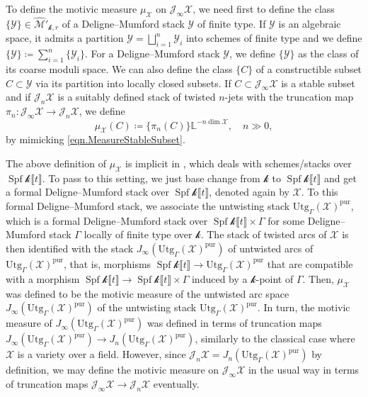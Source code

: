 \documentclass[12pt]{amsart}
\theoremstyle{plain}   %
\theoremstyle{definition}    %
\theoremstyle{remark}    %
\numberwithin{equation}{theorem}
\DeclareMathOperator{\Spf}{{Spf}}
\newcommand{\kay}{\mathcal{k}}
\newcommand{\sJ}{\mathcal{J}}
\newcommand{\sM}{\mathcal{M}}
\newcommand{\sX}{\mathcal{X}}
\newcommand{\sY}{\mathcal{Y}}
\newcommand{\bL}{\mathbb{L}}
\begin{document}
To define the motivic measure $\mu_{\sX}$ on $\sJ_{\infty}\sX$, we need first to define the class $\{\sY\}\in \hat{\sM}'_{\kay,r}$ of a Deligne--Mumford stack $\sY$ of finite type. If $\sY$ is an algebraic space, it admits a partition $\sY=\bigsqcup_{i=1}^n\sY_i$ into schemes of finite type and we define $\{\sY\} \coloneqq \sum_{i=1}^n\{\sY_i\}$. For a Deligne--Mumford stack $\sY$, we define $\{\sY\}$ as the class of its coarse moduli space. We can also define the class $\{C\}$ of a constructible subset $C\subset \sY$ via its partition into locally closed subsets. If $C \subset \sJ_\infty \sX$ is a stable subset and if $\sJ_n \sX$ is a suitably defined stack of twisted $n$-jets with the truncation map $\pi_n \colon \sJ_\infty \sX\to \sJ_n \sX$, we define
\[
\mu_\sX(C)\coloneqq\{\pi_n(C)\}\bL^{-n\dim \sX},\quad n \gg 0,
\]
by mimicking \autoref{eqn.MeasureStableSubset}.

\begin{remark}
The above definition of $\mu_\sX$ is implicit in \cite{YasudaMotivicIntegrationDeligneMumfordStack}, which deals with schemes/stacks over $\Spf \kay\llbracket t\rrbracket$. To pass to this setting, we just base change from $\kay$ to $\Spf \kay\llbracket t \rrbracket$ and get a formal Deligne--Mumford stack over $\Spf \kay\llbracket t\rrbracket$, denoted again by $\sX$. To this formal Deligne--Mumford stack, we associate the untwisting stack $\mathrm{Utg}_\Gamma(\sX)^{\mathrm{pur}}$, which is a formal Deligne--Mumford stack over $\Spf \kay\llbracket t\rrbracket \times \Gamma$ for some Deligne--Mumford stack $\Gamma$ locally of finite type over $\kay$. 
The stack of twisted arcs of $\sX$ is then identified with the stack $J_\infty(\mathrm{Utg}_\Gamma(\sX)^{\mathrm{pur}})$ of untwisted arcs of $\mathrm{Utg}_\Gamma(\sX)^{\mathrm{pur}}$, that is, morphisms $\Spf \kay\llbracket t\rrbracket  \to \mathrm{Utg}_\Gamma(\sX)^{\mathrm{pur}}$ that are compatible with a morphism $\Spf \kay\llbracket t\rrbracket \to \Spf \kay\llbracket t\rrbracket \times \Gamma $ induced by a $\kay$-point of $\Gamma$. 
Then, $\mu_\sX$ was defined to be the motivic measure of the untwisted arc space $J_\infty(\mathrm{Utg}_\Gamma(\sX)^{\mathrm{pur}})$ of the untwisting stack $\mathrm{Utg}_\Gamma(\sX)^{\mathrm{pur}}$. In turn, the motivic measure of $J_\infty(\mathrm{Utg}_\Gamma(\sX)^{\mathrm{pur}})$ was defined in terms of truncation maps $J_\infty(\mathrm{Utg}_\Gamma(\sX)^{\mathrm{pur}})\to J_n(\mathrm{Utg}_\Gamma(\sX)^{\mathrm{pur}})$, similarly to the classical case where $\sX$ is a variety over a field. However, since  $\sJ_n \sX=J_n(\mathrm{Utg}_\Gamma(\sX)^{\mathrm{pur}})$ by definition, we may define the motivic measure on $\sJ_\infty \sX$ in the usual way in terms of truncation maps $\sJ_\infty \sX \to \sJ_n \sX$ eventually. 
\end{remark}
\end{document}

